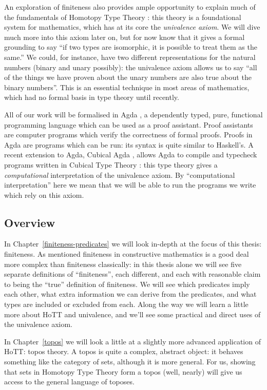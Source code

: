An exploration of finiteness also provides ample opportunity to explain much of
the fundamentals of Homotopy Type Theory \citep{hottbook}: this theory is a
foundational system for mathematics, which has at its core the \emph{univalence
  axiom}.
We will dive much more into this axiom later on, but for now know that it gives
a formal grounding to say ``if two types are isomorphic, it is possible to treat
them as the same.''
We could, for instance, have two different representations for the natural
numbers (binary and unary possibly): the univalence axiom allows us to say ``all
of the things we have proven about the unary numbers are also true about the
binary numbers''.
This is an essential technique in most areas of mathematics, which
had no formal basis in type theory until recently.

All of our work will be formalised in Agda
\citep{norellDependentlyTypedProgramming2008}, a
dependently typed, pure, functional programming language which can be
used as a proof assistant.
Proof assistants are computer programs which verify the correctness of formal
proofs.
Proofs in Agda are programs which can be run: its syntax is quite similar to
Haskell's.
A recent extension to Agda, Cubical Agda
\citep{vezzosiCubicalAgdaDependently2019}, allows Agda to compile and typecheck
programs written in Cubical Type Theory \citep{cohenCubicalTypeTheory2016}: this
type theory gives a \emph{computational} interpretation of the univalence axiom.
By ``computational interpretation'' here we mean that we will be able to run the
programs we write which rely on this axiom.
\subsection{Overview}
In Chapter~\ref{finiteness-predicates} we will look in-depth at the focus of
this thesis: finiteness.
As mentioned finiteness in constructive mathematics is a good deal more complex
than finiteness classically:
in this thesis alone we will see five separate definitions of ``finiteness'',
each different, and each with reasonable claim to being the ``true'' definition
of finiteness.
We will see which predicates imply each other, what extra information we can
derive from the predicates, and what types are included or excluded from each.
Along the way we will learn a little more about HoTT and univalence, and we'll
see some practical and direct uses of the univalence axiom.

In Chapter~\ref{topos} we will look a little at a slightly more advanced
application of HoTT: topos theory.
A topos is quite a complex, abstract object: it behaves something like the
category of sets, although it is more general.
For us, showing that sets in Homotopy Type Theory form a topos (well, nearly)
will give us access to the general language of toposes.

